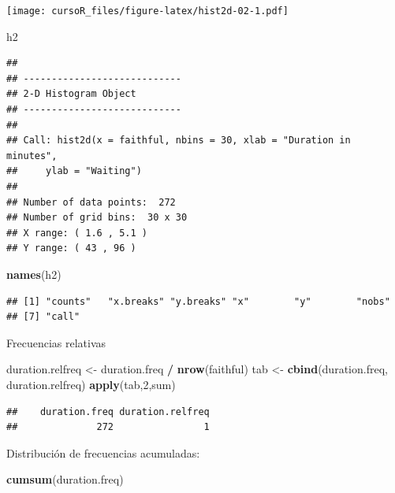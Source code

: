 \documentclass[]{book}
\newenvironment{Shaded}{\begin{snugshade}}{\end{snugshade}}
\newcommand{\KeywordTok}[1]{\textcolor[rgb]{0.13,0.29,0.53}{\textbf{#1}}}
\newcommand{\DecValTok}[1]{\textcolor[rgb]{0.00,0.00,0.81}{#1}}
\newcommand{\StringTok}[1]{\textcolor[rgb]{0.31,0.60,0.02}{#1}}
\newcommand{\OperatorTok}[1]{\textcolor[rgb]{0.81,0.36,0.00}{\textbf{#1}}}
\newcommand{\NormalTok}[1]{#1}
\begin{document}
\texttt{[image: cursoR\_files/figure-latex/hist2d-02-1.pdf]}

\begin{Shaded}
\begin{Highlighting}[]
\NormalTok{h2}
\end{Highlighting}
\end{Shaded}

\begin{verbatim}
## 
## ----------------------------
## 2-D Histogram Object
## ----------------------------
## 
## Call: hist2d(x = faithful, nbins = 30, xlab = "Duration in minutes", 
##     ylab = "Waiting")
## 
## Number of data points:  272 
## Number of grid bins:  30 x 30 
## X range: ( 1.6 , 5.1 )
## Y range: ( 43 , 96 )
\end{verbatim}

\begin{Shaded}
\begin{Highlighting}[]
\KeywordTok{names}\NormalTok{(h2)}
\end{Highlighting}
\end{Shaded}

\begin{verbatim}
## [1] "counts"   "x.breaks" "y.breaks" "x"        "y"        "nobs"    
## [7] "call"
\end{verbatim}

Frecuencias relativas

\begin{Shaded}
\begin{Highlighting}[]
\NormalTok{duration.relfreq <-}\StringTok{ }\NormalTok{duration.freq }\OperatorTok{/}\StringTok{ }\KeywordTok{nrow}\NormalTok{(faithful) }
\NormalTok{tab <-}\StringTok{ }\KeywordTok{cbind}\NormalTok{(duration.freq, duration.relfreq) }
\KeywordTok{apply}\NormalTok{(tab,}\DecValTok{2}\NormalTok{,sum)}
\end{Highlighting}
\end{Shaded}

\begin{verbatim}
##    duration.freq duration.relfreq 
##              272                1
\end{verbatim}

Distribución de frecuencias acumuladas:

\begin{Shaded}
\begin{Highlighting}[]
\KeywordTok{cumsum}\NormalTok{(duration.freq)}
\end{Highlighting}
\end{Shaded}
\end{document}
